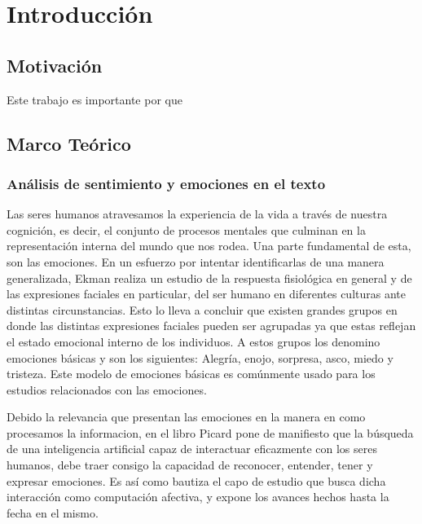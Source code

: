 \chapter{Introducción}






\section{Motivación}

Este trabajo es importante por que 



\section{Marco Teórico}



\subsection{Análisis de sentimiento y emociones en el texto}

Las seres humanos atravesamos la experiencia de la vida a través de nuestra cognición, es decir, el conjunto de procesos mentales que culminan en la representación interna del mundo que nos rodea. Una parte fundamental de esta, son las emociones. En un esfuerzo por intentar identificarlas de una manera generalizada, Ekman \cite{ekman1993facial}  realiza un estudio de la respuesta fisiológica en general y de las  expresiones faciales en particular, del ser humano en diferentes culturas ante distintas circunstancias. Esto lo lleva a concluir que existen grandes grupos en donde las distintas expresiones faciales pueden ser agrupadas ya que estas reflejan el estado emocional interno de los individuos. A estos grupos los denomino emociones básicas y son los siguientes: Alegría, enojo, sorpresa, asco, miedo y tristeza. Este modelo de emociones básicas es comúnmente usado para los estudios relacionados con las emociones. 

Debido la relevancia que presentan las emociones en la manera en como procesamos la informacion, en el libro \cite{picard2000affective} Picard pone de manifiesto que la búsqueda de una inteligencia artificial capaz de interactuar eficazmente con los seres humanos, debe traer consigo la capacidad de reconocer, entender, tener y expresar emociones. Es así como bautiza el capo de estudio que busca dicha interacción como computación afectiva, y expone los avances hechos hasta la fecha en el mismo.


